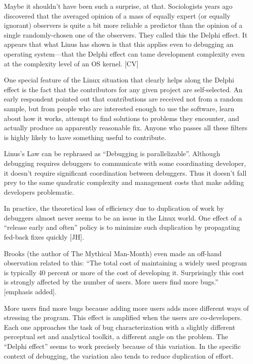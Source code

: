 \documentclass[a4paper,12pt,UTF8,twoside]{ctexbook}
\begin{document}
Maybe it shouldn't have been such a surprise, at that. Sociologists years ago discovered that the averaged opinion of a mass of equally expert (or equally ignorant) observers is quite a bit more reliable a predictor than the opinion of a single randomly-chosen one of the observers. They called this the Delphi effect. It appears that what Linus has shown is that this applies even to debugging an operating system—that the Delphi effect can tame development complexity even at the complexity level of an OS kernel. [CV]

One special feature of the Linux situation that clearly helps along the Delphi effect is the fact that the contributors for any given project are self-selected. An early respondent pointed out that contributions are received not from a random sample, but from people who are interested enough to use the software, learn about how it works, attempt to find solutions to problems they encounter, and actually produce an apparently reasonable fix. Anyone who passes all these filters is highly likely to have something useful to contribute.

Linus's Law can be rephrased as ``Debugging is parallelizable''. Although debugging requires debuggers to communicate with some coordinating developer, it doesn't require significant coordination between debuggers. Thus it doesn't fall prey to the same quadratic complexity and management costs that make adding developers problematic.

In practice, the theoretical loss of efficiency due to duplication of work by debuggers almost never seems to be an issue in the Linux world. One effect of a ``release early and often'' policy is to minimize such duplication by propagating fed-back fixes quickly [JH].

Brooks (the author of The Mythical Man-Month) even made an off-hand observation related to this: ``The total cost of maintaining a widely used program is typically 40 percent or more of the cost of developing it. Surprisingly this cost is strongly affected by the number of users. More users find more bugs.'' [emphasis added].

More users find more bugs because adding more users adds more different ways of stressing the program. This effect is amplified when the users are co-developers. Each one approaches the task of bug characterization with a slightly different perceptual set and analytical toolkit, a different angle on the problem. The ``Delphi effect'' seems to work precisely because of this variation. In the specific context of debugging, the variation also tends to reduce duplication of effort.
\end{document}
